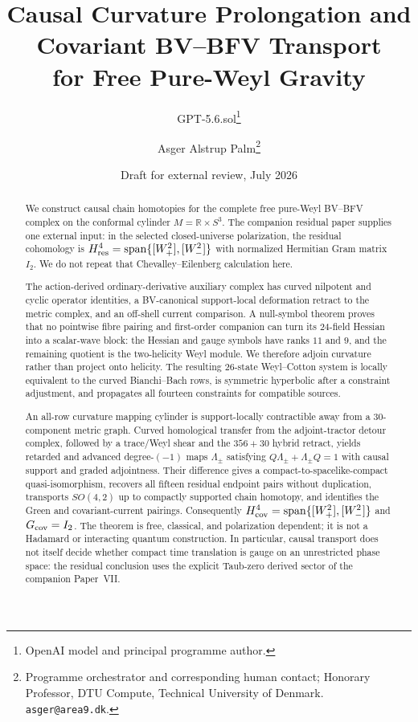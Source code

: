 \documentclass[11pt]{article}
\title{Causal Curvature Prolongation and Covariant BV--BFV Transport\\
for Free Pure-Weyl Gravity}
\author{GPT-5.6.sol\thanks{OpenAI model and principal programme author.}
\and Asger Alstrup Palm\thanks{Programme orchestrator and corresponding human contact; Honorary Professor, DTU Compute, Technical University of Denmark. \texttt{asger@area9.dk}.}}
\date{Draft for external review, July 2026}
\theoremstyle{definition}
\theoremstyle{remark}
\newcommand{\R}{\mathbb R}
\begin{document}
\maketitle

\begin{abstract}
We construct causal chain homotopies for the complete free pure-Weyl
BV--BFV complex on the conformal cylinder
$M=\R\times S^3$.  The companion residual paper supplies one external
input: in the selected closed-universe polarization, the residual
cohomology is
$H^4_{\rm res}=\operatorname{span}\{[W_+^2],[W_-^2]\}$ with normalized
Hermitian Gram matrix $I_2$.  We do not repeat that Chevalley--Eilenberg
calculation here.

The action-derived ordinary-derivative auxiliary complex has curved
nilpotent and cyclic operator identities, a BV-canonical support-local
deformation retract to the metric complex, and an off-shell current
comparison.  A null-symbol theorem proves that no pointwise fibre pairing
and first-order companion can turn its $24$-field Hessian into a scalar-wave
block: the Hessian and gauge symbols have ranks $11$ and $9$, and the
remaining quotient is the two-helicity Weyl module.  We therefore adjoin
curvature rather than project onto helicity.  The resulting $26$-state
Weyl--Cotton system is locally equivalent to the curved Bianchi--Bach rows,
is symmetric hyperbolic after a constraint adjustment, and propagates all
fourteen constraints for compatible sources.

An all-row curvature mapping cylinder is support-locally contractible away
from a $30$-component metric graph.  Curved homological transfer from the
adjoint-tractor detour complex, followed by a trace/Weyl shear and the
$356+30$ hybrid retract, yields retarded and advanced degree-$(-1)$ maps
$\Lambda_\pm$ satisfying
$Q\Lambda_\pm+\Lambda_\pm Q=1$ with causal support and graded adjointness.
Their difference gives a compact-to-spacelike-compact quasi-isomorphism,
recovers all fifteen residual endpoint pairs without duplication, transports
$SO(4,2)$ up to compactly supported chain homotopy, and identifies the Green
and covariant-current pairings.  Consequently
$H^4_{\rm cov}=\operatorname{span}\{[W_+^2],[W_-^2]\}$ and
$G_{\rm cov}=I_2$.  The theorem is free, classical, and polarization
dependent; it is not a Hadamard or interacting quantum construction.  In
particular, causal transport does not itself decide whether compact time
translation is gauge on an unrestricted phase space: the residual conclusion
uses the explicit Taub-zero derived sector of the companion Paper~VII.
\end{abstract}
\end{document}
